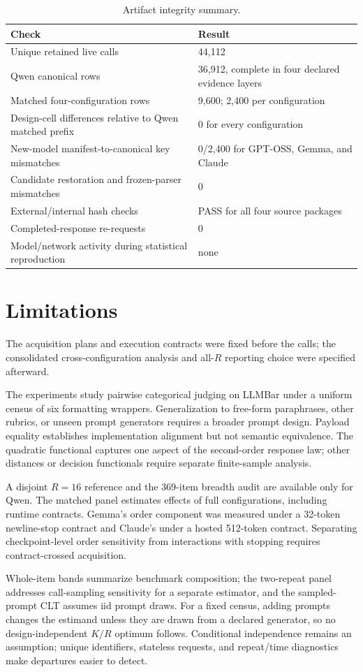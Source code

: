 \documentclass[letterpaper]{article}
\newcommand{\1}{\mathbf 1}
\begin{document}
\begin{table}[t]
\centering
\small
\caption{Artifact integrity summary.}
\label{tab:s-integrity}
\begin{tabular}{p{}p{}}
\toprule
Check & Result \\
\midrule
Unique retained live calls & 44,112 \\
Qwen canonical rows & 36,912, complete in four declared evidence layers \\
Matched four-configuration rows & 9,600; 2,400 per configuration \\
Design-cell differences relative to Qwen matched prefix & 0 for every configuration \\
New-model manifest-to-canonical key mismatches & 0/2,400 for GPT-OSS, Gemma, and Claude \\
Candidate restoration and frozen-parser mismatches & 0 \\
External/internal hash checks & PASS for all four source packages \\
Completed-response re-requests & 0 \\
Model/network activity during statistical reproduction & none \\
\bottomrule
\end{tabular}
\end{table}

\FloatBarrier
\section{Limitations}

The acquisition plans and execution contracts were fixed before the calls;
the consolidated cross-configuration analysis and all-$R$ reporting choice
were specified afterward.

The experiments study pairwise categorical judging on LLMBar under a uniform
census of six formatting wrappers. Generalization to free-form paraphrases,
other rubrics, or unseen prompt generators requires a broader prompt design.
Payload equality establishes implementation alignment but not semantic
equivalence. The quadratic functional captures one aspect of the second-order
response law; other distances or decision functionals require separate
finite-sample analysis.

A disjoint $R=16$ reference and the 369-item breadth audit are available only
for Qwen. The matched panel estimates effects of full configurations,
including runtime contracts. Gemma's order component was measured under a
32-token newline-stop contract and Claude's under a hosted 512-token contract.
Separating checkpoint-level order sensitivity from interactions with stopping
requires contract-crossed acquisition.

Whole-item bands summarize benchmark composition; the two-repeat panel
addresses call-sampling sensitivity for a separate estimator, and the
sampled-prompt CLT assumes iid prompt draws. For a fixed census, adding prompts
changes the estimand unless they are drawn from a declared generator, so no
design-independent $K/R$ optimum follows. Conditional independence remains an
assumption; unique identifiers, stateless requests, and repeat/time diagnostics
make departures easier to detect.
\end{document}
